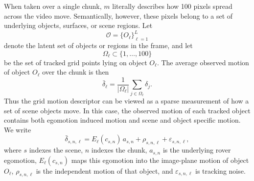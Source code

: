 \documentclass[letterpaper]{article} %
\begin{document}
When taken over a single chunk, $m$ literally describes how 100 pixels spread across the video move. Semantically, however, these pixels belong to a set of underlying objects, surfaces, or scene regions. Let
\begin{equation}
    \mathcal{O}=\{O_\ell\}_{\ell=1}^{L}
\end{equation}
denote the latent set of objects or regions in the frame, and let
\begin{equation}
    \Omega_\ell \subset \{1,\ldots,100\}
\end{equation}
be the set of tracked grid points lying on object $O_\ell$. The average observed motion of object $O_\ell$ over the chunk is then
\begin{equation}
    \bar{\delta}_\ell
    =
    \frac{1}{|\Omega_\ell|}
    \sum_{j\in\Omega_\ell}
    \delta_j.
    \label{eq:object_average_motion}
\end{equation}
Thus the grid motion descriptor can be viewed as a sparse measurement of how a set of scene objects move. In this case, the observed motion of each tracked object contains both egomotion induced motion and scene and object specific motion. We write
\begin{equation}
    \bar{\delta}_{s,n,\ell}
    =
    E_\ell(c_{s,n})\, a_{s,n}
    +
    \rho_{s,n,\ell}
    +
    \varepsilon_{s,n,\ell},
    \label{eq:object_motion_decomposition}
\end{equation}
where $s$ indexes the scene, $n$ indexes the chunk, $a_{s,n}$ is the underlying rover egomotion, $E_\ell(c_{s,n})$ maps this egomotion into the image-plane motion of object $O_\ell$, $\rho_{s,n,\ell}$ is the independent motion of that object, and $\varepsilon_{s,n,\ell}$ is tracking noise.
\end{document}
